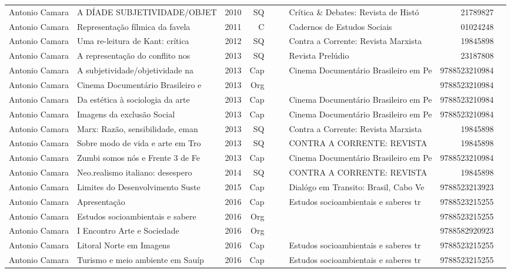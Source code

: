 \documentclass[12pt,brazil]{article}\usepackage[]{graphicx}\usepackage[]{xcolor}
\begin{document}
\begin{longtable}{lllrrllrr}
Antonio Camara & A DÍADE SUBJETIVIDADE/OBJET & 2010 & SQ &  &  & Crítica \& Debates: Revista de Histó & 21789827 \\
Antonio Camara & Representação fílmica da favela  & 2011 & C &  &  & Cadernos de Estudos Sociais & 01024248 \\
Antonio Camara & Uma re-leitura de Kant: crítica  & 2012 & SQ &  &  & Contra a Corrente: Revista Marxista  & 19845898 \\
Antonio Camara & A representação do conflito nos  & 2013 & SQ &  &  & Revista Prelúdio & 23187808 \\
Antonio Camara & A subjetividade/objetividade na  & 2013 & Cap &  &  & Cinema Documentário Brasileiro em Pe & 9788523210984 \\
Antonio Camara & Cinema Documentário Brasileiro e & 2013 & Org &  &  &  & 9788523210984 \\
Antonio Camara & Da estética à sociologia da arte & 2013 & Cap &  &  & Cinema Documentário Brasileiro em Pe & 9788523210984 \\
Antonio Camara & Imagens da exclusão Social & 2013 & Cap &  &  & Cinema Documentário Brasileiro em Pe & 9788523210984 \\
Antonio Camara & Marx: Razão, sensibilidade, eman & 2013 & SQ &  &  & Contra a Corrente: Revista Marxista  & 19845898 \\
Antonio Camara & Sobre modo de vida e arte em Tro & 2013 & SQ &  &  & CONTRA A CORRENTE: REVISTA  & 19845898 \\
Antonio Camara & Zumbi somos nós e Frente 3 de Fe & 2013 & Cap &  &  & Cinema Documentário Brasileiro em Pe & 9788523210984 \\
Antonio Camara & Neo.realismo italiano: desespero & 2014 & SQ &  &  & CONTRA A CORRENTE: REVISTA  & 19845898 \\
Antonio Camara & Limites do Desenvolvimento Suste & 2015 & Cap &  &  & Dialógo em Transito: Brasil, Cabo Ve & 9788523213923 \\
Antonio Camara & Apresentação & 2016 & Cap &  &  & Estudos socioambientais e saberes tr & 9788523215255 \\
Antonio Camara & Estudos socioambientais e sabere & 2016 & Org &  &  &  & 9788523215255 \\
Antonio Camara & I Encontro Arte e Sociedade & 2016 & Org &  &  &  & 9788582920923 \\
Antonio Camara & Litoral Norte em Imagens & 2016 & Cap &  &  & Estudos socioambientais e saberes tr & 9788523215255 \\
Antonio Camara & Turismo e meio ambiente em Sauíp & 2016 & Cap &  &  & Estudos socioambientais e saberes tr & 9788523215255 \\

\end{longtable}
\end{document}
